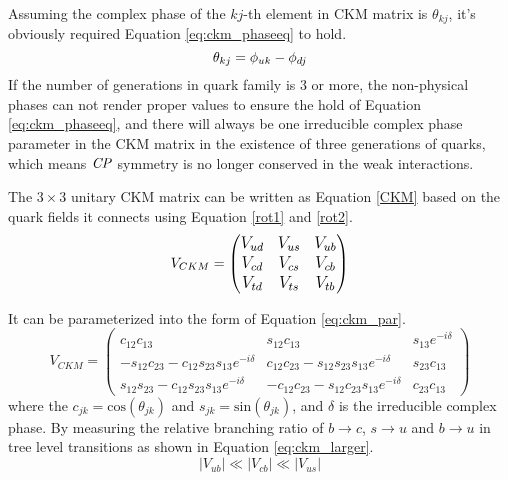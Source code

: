 Assuming the complex phase of the $kj$-th element in CKM matrix is $\theta_{kj}$, it's obviously required Equation \ref{eq:ckm_phaseeq} to hold.
\begin{equation}\label{eq:ckm_phaseeq}
\large
\theta_{kj} = \phi_{uk}-\phi_{dj}
\end{equation}
If the number of generations in quark family is 3 or more, the non-physical phases can not render proper values to ensure the hold of Equation \ref{eq:ckm_phaseeq}, and there will always be one irreducible complex phase parameter in the CKM matrix in the existence of three generations of quarks, which means $\it{CP}$ symmetry is no longer conserved in the weak interactions. 

The $3\times 3$ unitary CKM matrix can be written as Equation \ref{CKM} based on the quark fields it connects using Equation \ref{rot1} and \ref{rot2}.
\begin{equation}\label{CKM}
\large
V_{CKM}=
\begin{pmatrix}
V_{ud} & V_{us} & V_{ub}\\
V_{cd} & V_{cs} & V_{cb}\\
V_{td} & V_{ts} & V_{tb}\\
\end{pmatrix}
\end{equation}

It can be parameterized into the form of Equation \ref{eq:ckm_par}.
\begin{equation}\label{eq:ckm_par}
V_{CKM}=
\begin{pmatrix}
c_{12}c_{13} & s_{12}c_{13} & s_{13}e^{-i\delta }\\
-s_{12}c_{23}-c_{12}s_{23}s_{13}e^{-i\delta } &c_{12}c_{23}-s_{12}s_{23}s_{13}e^{-i\delta } & s_{23}c_{13}\\
s_{12}s_{23}-c_{12}s_{23}s_{13}e^{-i\delta }  & -c_{12}c_{23}-s_{12}c_{23}s_{13}e^{-i\delta } & c_{23}c_{13}
\end{pmatrix}
\end{equation}
where the $c_{jk}=\text{cos}(\theta_{jk})$ and $s_{jk}=\text{sin}(\theta_{jk})$, and $\delta$ is the irreducible complex phase. By measuring the relative branching ratio of $b\to c$, $s\to u$ and $b\to u$ in tree level transitions as shown in Equation \ref{eq:ckm_larger}.
\begin{equation}\label{eq:ckm_larger}
|V_{ub}|\ll |V_{cb}|\ll |V_{us}|
\end{equation}

